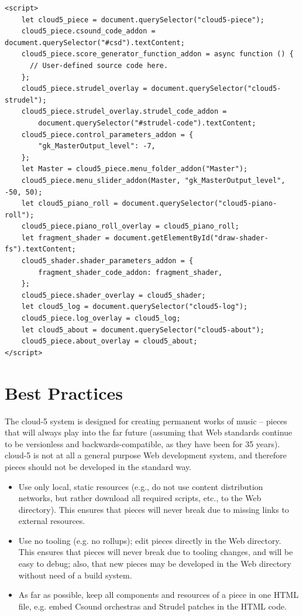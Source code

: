 \documentclass[runningheads,a4paper]{llncs}
\begin{document}
\begin{verbatim}
<script>
    let cloud5_piece = document.querySelector("cloud5-piece");
    cloud5_piece.csound_code_addon = document.querySelector("#csd").textContent;
    cloud5_piece.score_generator_function_addon = async function () {
      // User-defined source code here.
    };
    cloud5_piece.strudel_overlay = document.querySelector("cloud5-strudel");
    cloud5_piece.strudel_overlay.strudel_code_addon = 
        document.querySelector("#strudel-code").textContent;
    cloud5_piece.control_parameters_addon = {
        "gk_MasterOutput_level": -7,
    };
    let Master = cloud5_piece.menu_folder_addon("Master");
    cloud5_piece.menu_slider_addon(Master, "gk_MasterOutput_level", -50, 50);
    let cloud5_piano_roll = document.querySelector("cloud5-piano-roll");
    cloud5_piece.piano_roll_overlay = cloud5_piano_roll;
    let fragment_shader = document.getElementById("draw-shader-fs").textContent;
    cloud5_shader.shader_parameters_addon = {
        fragment_shader_code_addon: fragment_shader,
    };
    cloud5_piece.shader_overlay = cloud5_shader;
    let cloud5_log = document.querySelector("cloud5-log");
    cloud5_piece.log_overlay = cloud5_log;
    let cloud5_about = document.querySelector("cloud5-about");
    cloud5_piece.about_overlay = cloud5_about;
</script>
\end{verbatim}

\section{Best Practices}

The cloud-5 system is designed for creating permanent works of music -- pieces that will always play into the far future (assuming that Web standards continue to be versionless and backwards-compatible, as they have been for 35 years). cloud-5 is not at all a general purpose Web development system, and therefore pieces should not be developed in the standard way.

\begin{itemize}
\item Use only local, static resources (e.g., do not use content distribution networks, but rather download all required scripts, etc., to the Web directory). This ensures that pieces will never break due to missing links to external resources.
\item Use no tooling (e.g. no rollups); edit pieces directly in the Web directory. This ensures that pieces will never break due to tooling changes, and will be easy to debug; also, that new pieces may be developed in the Web directory without need of a build system.
\item As far as possible, keep all components and resources of a piece in one HTML file, e.g. embed Csound orchestras and Strudel patches in the HTML code.
\end{itemize}
\end{document}
